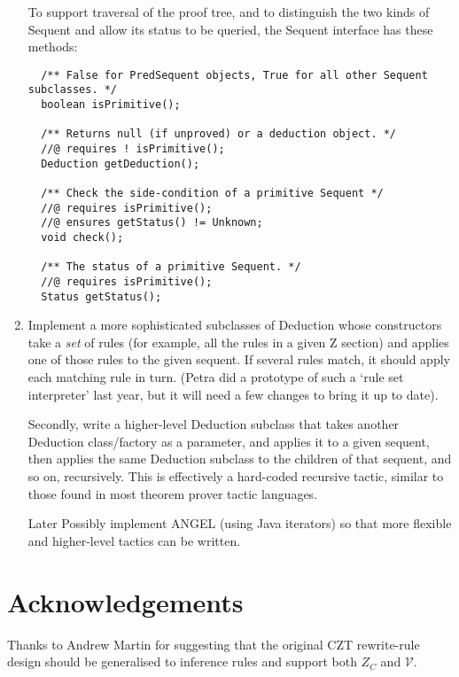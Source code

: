 \documentclass{article}
\newcommand{\V}{\mathcal{V}}
\begin{document}
\begin{enumerate}
  To support traversal of the proof tree, and to distinguish
  the two kinds of Sequent and allow its status to be queried,
  the Sequent interface has these methods:
\begin{verbatim}
  /** False for PredSequent objects, True for all other Sequent subclasses. */
  boolean isPrimitive();

  /** Returns null (if unproved) or a deduction object. */
  //@ requires ! isPrimitive();
  Deduction getDeduction();

  /** Check the side-condition of a primitive Sequent */
  //@ requires isPrimitive();
  //@ ensures getStatus() != Unknown;
  void check();

  /** The status of a primitive Sequent. */
  //@ requires isPrimitive();
  Status getStatus();
\end{verbatim}


\item Implement a more sophisticated subclasses of Deduction
  whose constructors take a \emph{set} of rules (for example, all the rules
  in a given Z section) and applies one of those rules to the given
  sequent.  If several rules match, it should apply each matching rule
  in turn.  (Petra did a prototype of such a `rule set interpreter'
  last year, but it will need a few changes to bring it up to date).

  Secondly, write a higher-level Deduction subclass that takes
  another Deduction class/factory as a parameter, and applies it
  to a given sequent, then applies the same Deduction subclass to the
  children of that sequent, and so on, recursively.  This is effectively
  a hard-coded recursive tactic, similar to those found in most
  theorem prover tactic languages.

\item [Later] Possibly implement ANGEL (using Java iterators)
  so that more flexible and higher-level tactics can be written.
\end{enumerate}

\section{Acknowledgements}

Thanks to Andrew Martin for suggesting that the original
CZT rewrite-rule design should be generalised to inference
rules and support both $Z_C$ and $\V$.



\end{document}
